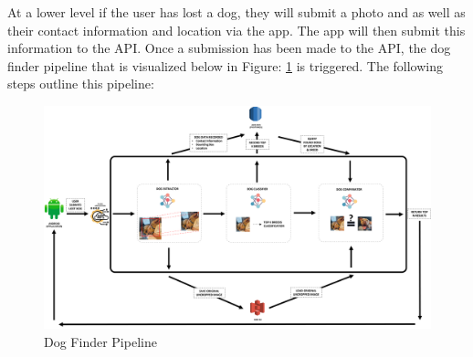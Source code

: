 \documentclass{article}
\begin{document}
At a lower level if the user has lost a dog, they will submit a photo and as well as their contact information and location via the app.  The app will then submit this information to the API.  Once a submission has been made to the API, the dog finder pipeline that is visualized below in Figure: \ref{fig:x app pipeline} is triggered.  The following steps outline this pipeline:
\newpage

\begin{figure}[h]
\centering
	\includegraphics[width=1.0\textwidth]{final-report-images/applowlevel.png}
\caption{Dog Finder Pipeline}
\label{fig:x app pipeline}
\end{figure}
\end{document}
